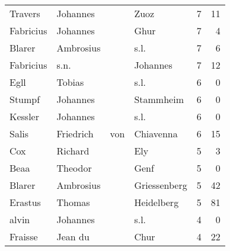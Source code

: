\begin{tabular}{llllrr}
                  Travers &                           Johannes &             &                                        Zuoz &          7 &        11 \\
                Fabricius &                           Johannes &             &                                        Ghur &          7 &         4 \\
                   Blarer &                          Ambrosius &             &                                        s.l. &          7 &         6 \\
                Fabricius &                               s.n. &             &                                    Johannes &          7 &        12 \\
                     Egll &                             Tobias &             &                                        s.l. &          6 &         0 \\
                   Stumpf &                           Johannes &             &                                   Stammheim &          6 &         0 \\
                  Kessler &                           Johannes &             &                                        s.l. &          6 &         0 \\
                    Salis &                          Friedrich &         von &                                   Chiavenna &          6 &        15 \\
                      Cox &                            Richard &             &                                         Ely &          5 &         3 \\
                     Beaa &                            Theodor &             &                                        Genf &          5 &         0 \\
                   Blarer &                          Ambrosius &             &                                Griessenberg &          5 &        42 \\
                  Erastus &                             Thomas &             &                                  Heidelberg &          5 &        81 \\
                    alvin &                           Johannes &             &                                        s.l. &          4 &         0 \\
                  Fraisse &                            Jean du &             &                                        Chur &          4 &        22 \\

\end{tabular}
